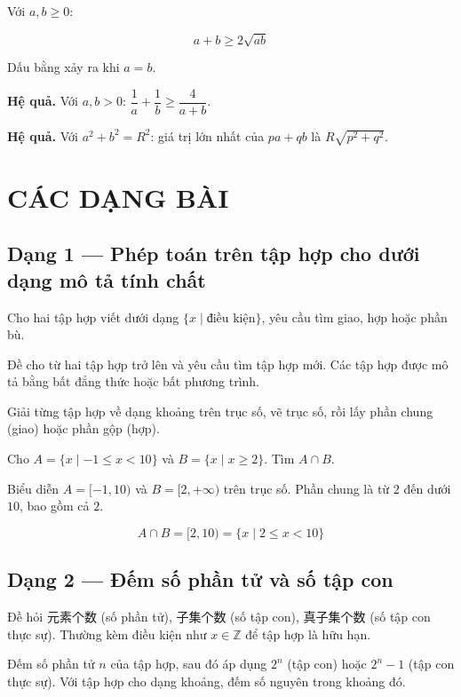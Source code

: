 \documentclass[11pt, a4paper]{article}
\begin{document}
\begin{dinhly}
Với $a, b \ge 0$:

$$a + b \ge 2\sqrt{ab}$$

Dấu bằng xảy ra khi $a = b$.

\textbf{Hệ quả.} Với $a, b > 0$: $\dfrac{1}{a} + \dfrac{1}{b} \ge \dfrac{4}{a+b}$.

\textbf{Hệ quả.} Với $a^2 + b^2 = R^2$: giá trị lớn nhất của $pa + qb$ là $R\sqrt{p^2 + q^2}$.

\end{dinhly}
\section{CÁC DẠNG BÀI}

\subsection{Dạng 1 — Phép toán trên tập hợp cho dưới dạng mô tả tính chất}

Cho hai tập hợp viết dưới dạng $\{x \mid \text{điều kiện}\}$, yêu cầu tìm giao, hợp hoặc phần bù.

 Đề cho từ hai tập hợp trở lên và yêu cầu tìm tập hợp mới. Các tập hợp được mô tả bằng bất đẳng thức hoặc bất phương trình.

 Giải từng tập hợp về dạng khoảng trên trục số, vẽ trục số, rồi lấy phần chung (giao) hoặc phần gộp (hợp).

\begin{vidu}[{1}]
Cho $A = \{x \mid -1 \le x < 10\}$ và $B = \{x \mid x \ge 2\}$. Tìm $A \cap B$.

Biểu diễn $A = [-1, 10)$ và $B = [2, +\infty)$ trên trục số. Phần chung là từ $2$ đến dưới $10$, bao gồm cả $2$.

$$A \cap B = [2, 10) = \{x \mid 2 \le x < 10\}$$

\end{vidu}
\subsection{Dạng 2 — Đếm số phần tử và số tập con}

 Đề hỏi 元素个数 (số phần tử), 子集个数 (số tập con), 真子集个数 (số tập con thực sự). Thường kèm điều kiện như $x \in \mathbb{Z}$ để tập hợp là hữu hạn.

 Đếm số phần tử $n$ của tập hợp, sau đó áp dụng $2^n$ (tập con) hoặc $2^n - 1$ (tập con thực sự). Với tập hợp cho dạng khoảng, đếm số nguyên trong khoảng đó.
\end{document}
